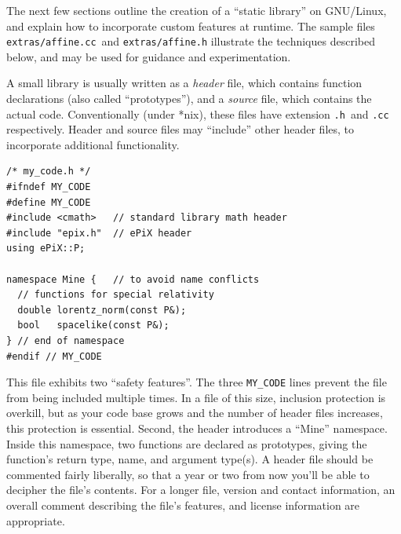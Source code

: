 \documentclass[12pt]{report}
\newcommand{\code}[1]{\texttt{#1}}
\newcommand{\filename}[1]{\texttt{#1}}
\begin{document}
The next few sections outline the creation of a ``static library'' on
GNU/Linux, and explain how to incorporate custom features at runtime.
The sample files \filename{extras/affine.cc}~and
\filename{extras/affine.h} illustrate the techniques described below,
and may be used for guidance and experimentation.

A small library is usually written as a \emph{header} file, which
contains function declarations (also called ``prototypes''), and a
\emph{source} file, which contains the actual code. Conventionally
(under *nix), these files have extension \filename{.h}~and \filename{.cc}
respectively. Header and source files may ``include'' other header
files, to incorporate additional functionality.
\begin{verbatim}
/* my_code.h */
#ifndef MY_CODE
#define MY_CODE
#include <cmath>   // standard library math header
#include "epix.h"  // ePiX header
using ePiX::P;

namespace Mine {   // to avoid name conflicts
  // functions for special relativity
  double lorentz_norm(const P&);
  bool   spacelike(const P&);
} // end of namespace
#endif // MY_CODE
\end{verbatim}
This file exhibits two ``safety features''. The three \code{MY\_CODE}
lines prevent the file from being included multiple times. In a file
of this size, inclusion protection is overkill, but as your code base
grows and the number of header files increases, this protection is
essential. Second, the header introduces a ``Mine'' namespace. Inside
this namespace, two functions are declared as prototypes, giving the
function's return type, name, and argument type(s). A header file
should be commented fairly liberally, so that a year or two from now
you'll be able to decipher the file's contents.  For a longer file,
version and contact information, an overall comment describing the
file's features, and license information are appropriate.
\end{document}
